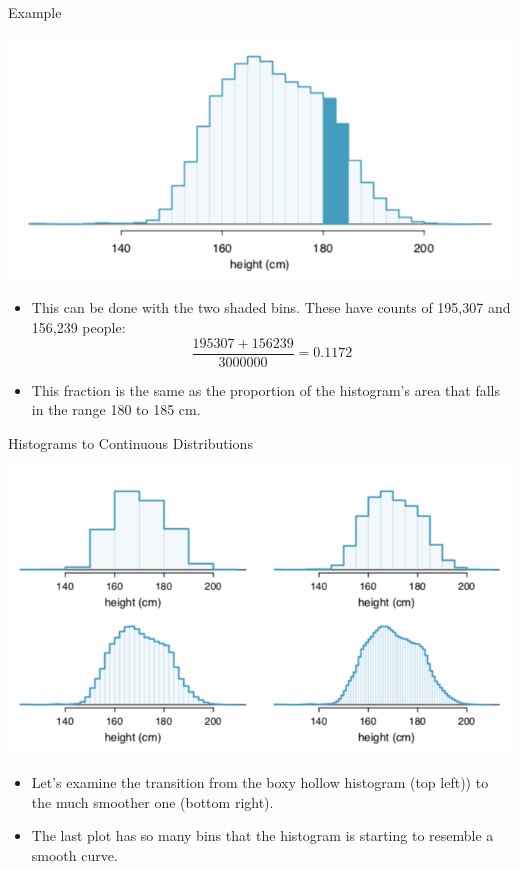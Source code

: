 \begin{frame}{Example}
    \begin{center}
        \includegraphics[scale=0.3]{images/heighthist.png}
    \end{center}
    \vspace{-20pt}\begin{itemize}
        \item This can be done with the two shaded bins. These have counts of 195,307 and 156,239 people:
        \[
            \frac{195307 + 156239}{3000000} = 0.1172 
        \]
        \item This fraction is the same as the proportion of the histogram’s area that falls in the range 180 to 185 cm.
    \end{itemize}
\end{frame}

\begin{frame}{Histograms to Continuous Distributions}
    \begin{center}
        \includegraphics[scale=0.35]{images/hists.png}
    \end{center}
    \vspace{-12pt}\begin{itemize}
        \item Let's examine the transition from the boxy hollow histogram (top left)) to the much smoother one (bottom right).
        \item The last plot has so many bins that the histogram is starting to resemble a smooth curve.
    \end{itemize}
\end{frame}

